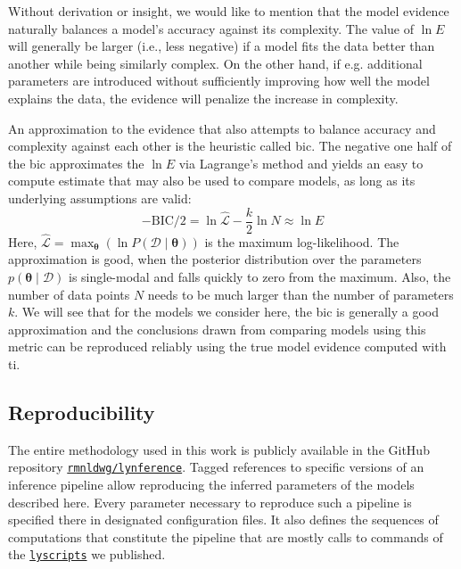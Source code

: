 \documentclass[twocolumn]{aastex631}
\begin{document}
Without derivation or insight, we would like to mention that the model evidence naturally balances a model's accuracy against its complexity. The value of $\ln E$ will generally be larger (i.e., less negative) if a model fits the data better than another while being similarly complex. On the other hand, if e.g. additional parameters are introduced without sufficiently improving how well the model explains the data, the evidence will penalize the increase in complexity.

An approximation to the evidence that also attempts to balance accuracy and complexity against each other is the heuristic called \gls{bic}. The negative one half of the \gls{bic} approximates the $\ln E$ via Lagrange's method \citep{bhat_Derivation_2010} and yields an easy to compute estimate that may also be used to compare models, as long as its underlying assumptions are valid:
%
\begin{equation} \label{eq:bic}
    - \text{BIC} / 2 = \ln{\hat{\mathcal{L}}} - \frac{k}{2} \ln{N} \approx \ln{E}
\end{equation}
%
Here, $\hat{\mathcal{L}} = \max_{\boldsymbol{\theta}}{\left( \ln P \left( \boldsymbol{\mathcal{D}} \mid \boldsymbol{\theta} \right)\right)}$ is the maximum log-likelihood. The approximation is good, when the posterior distribution over the parameters $p\left( \boldsymbol{\theta} \mid \boldsymbol{\mathcal{D}} \right)$ is single-modal and falls quickly to zero from the maximum. Also, the number of data points $N$ needs to be much larger than the number of parameters $k$. We will see that for the models we consider here, the \gls{bic} is generally a good approximation and the conclusions drawn from comparing models using this metric can be reproduced reliably using the true model evidence computed with \gls{ti}.

\vspace{5mm}

\subsection{Reproducibility}
\label{subsec:complete_model:reproducibility}

The entire methodology used in this work is publicly available in the GitHub repository \href{https://github.com/rmnldwg/lynference}{\texttt{rmnldwg/lynference}}. Tagged references to specific versions of an inference pipeline allow reproducing the inferred parameters of the models described here. Every parameter necessary to reproduce such a pipeline is specified there in designated configuration files. It also defines the sequences of computations that constitute the pipeline that are mostly calls to commands of the \href{https://pypi.org/project/lyscripts/}{\texttt{lyscripts}} we published.
\end{document}
